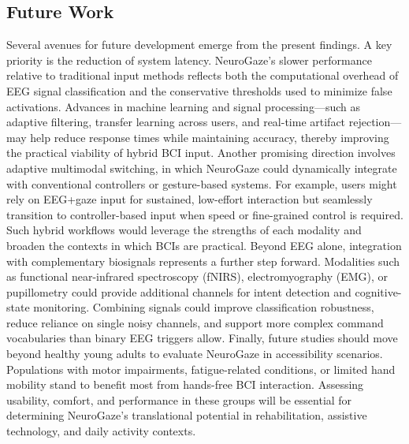 \documentclass[utf8]{FrontiersinHarvard} %
\begin{document}
\subsection{Future Work}
Several avenues for future development emerge from the present findings. A key priority is the reduction of system latency. NeuroGaze's slower performance relative to traditional input methods reflects both the computational overhead of EEG signal classification and the conservative thresholds used to minimize false activations. Advances in machine learning and signal processing—such as adaptive filtering, transfer learning across users, and real-time artifact rejection—may help reduce response times while maintaining accuracy, thereby improving the practical viability of hybrid BCI input.
Another promising direction involves adaptive multimodal switching, in which NeuroGaze could dynamically integrate with conventional controllers or gesture-based systems. For example, users might rely on EEG+gaze input for sustained, low-effort interaction but seamlessly transition to controller-based input when speed or fine-grained control is required. Such hybrid workflows would leverage the strengths of each modality and broaden the contexts in which BCIs are practical.
Beyond EEG alone, integration with complementary biosignals represents a further step forward. Modalities such as functional near-infrared spectroscopy (fNIRS), electromyography (EMG), or pupillometry could provide additional channels for intent detection and cognitive-state monitoring. Combining signals could improve classification robustness, reduce reliance on single noisy channels, and support more complex command vocabularies than binary EEG triggers allow.
Finally, future studies should move beyond healthy young adults to evaluate NeuroGaze in accessibility scenarios. Populations with motor impairments, fatigue-related conditions, or limited hand mobility stand to benefit most from hands-free BCI interaction. Assessing usability, comfort, and performance in these groups will be essential for determining NeuroGaze's translational potential in rehabilitation, assistive technology, and daily activity contexts.
\end{document}

